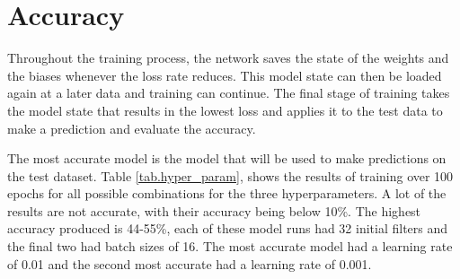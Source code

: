 \section{Accuracy}
Throughout the training process, the network saves the state of the weights and the biases whenever the loss rate reduces. This model state can then be loaded again at a later data and training can continue. The final stage of training takes the model state that results in the lowest loss and applies it to the test data to make a prediction and evaluate the accuracy.
\par
The most accurate model is the model that will be used to make predictions on the test dataset. Table \ref{tab.hyper_param}, shows the results of training over 100 epochs for all possible combinations for the three hyperparameters. A lot of the results are not accurate, with their accuracy being below 10\%. The highest accuracy produced is 44-55\%, each of these model runs had 32 initial filters and the final two had batch sizes of 16. The most accurate model had a learning rate of 0.01 and the second most accurate had a learning rate of 0.001. 
